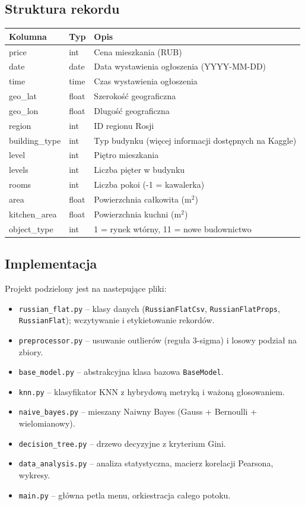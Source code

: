 \documentclass[12pt,a4paper]{article}
\begin{document}
	\subsection{Struktura rekordu}
	\begin{center}
	\begin{tabular}{|l|l|l|}
		\hline
		\textbf{Kolumna} & \textbf{Typ} & \textbf{Opis} \\
		\hline
		price & int & Cena mieszkania (RUB) \\
		date & date & Data wystawienia ogłoszenia (YYYY-MM-DD) \\
		time & time & Czas wystawienia ogłoszenia \\
		geo\_lat & float & Szerokość geograficzna \\
		geo\_lon & float & Dlugość geograficzna \\
		region & int & ID regionu Rosji \\
		building\_type & int & Typ budynku (więcej informacji dostępnych na Kaggle) \\
		level & int & Piętro mieszkania \\
		levels & int & Liczba pięter w budynku \\
		rooms & int & Liczba pokoi (-1 = kawalerka) \\
		area & float & Powierzchnia całkowita (m$^2$) \\
		kitchen\_area & float & Powierzchnia kuchni (m$^2$) \\
		object\_type & int & 1 = rynek wtórny, 11 = nowe budownictwo \\
		\hline
	\end{tabular}
	\end{center}

	\newpage
	\subsection{Implementacja}
	Projekt podzielony jest na nastepujące pliki:
	\begin{itemize}
		\item \texttt{russian\_flat.py} -- klasy danych (\texttt{RussianFlatCsv}, \texttt{RussianFlatProps}, \texttt{RussianFlat}); wczytywanie i etykietowanie rekordów.
		\item \texttt{preprocessor.py} -- usuwanie outlierów (reguła 3-sigma) i losowy podział na zbiory.
		\item \texttt{base\_model.py} -- abstrakcyjna klasa bazowa \texttt{BaseModel}.
		\item \texttt{knn.py} -- klasyfikator KNN z hybrydową metryką i ważoną głosowaniem.
		\item \texttt{naive\_bayes.py} -- mieszany Naiwny Bayes (Gauss + Bernoulli + wielomianowy).
		\item \texttt{decision\_tree.py} -- drzewo decyzyjne z kryterium Gini.
		\item \texttt{data\_analysis.py} -- analiza statystyczna, macierz korelacji Pearsona, wykresy.
		\item \texttt{main.py} -- główna petla menu, orkiestracja całego potoku.
	\end{itemize}
	
\end{document}
